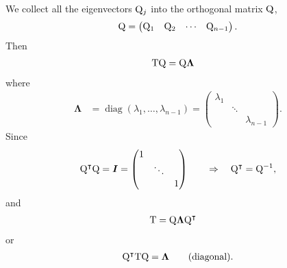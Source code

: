 We collect all the eigenvectors ${\mathrm Q}_j$ into the orthogonal matrix ${\mathrm Q}$,
\begin{equation*}
  {\mathrm Q} = \begin{pmatrix} {\mathrm Q}_1 & {\mathrm Q}_2 & \cdots & {\mathrm Q}_{n-1}\end{pmatrix}.
\end{equation*}
Then
\begin{align*}
  {\mathrm T} {\mathrm Q} &= {\mathrm Q} \boldsymbol \Lambda
\end{align*}
where
\begin{align*}
  \bm \Lambda &= \operatorname{diag}(\lambda_1, \ldots, \lambda_{n-1}) =
  \begin{pmatrix}
    \lambda_1 & & \\
     & \ddots & \\
    & & \lambda_{n-1}
  \end{pmatrix}.
\end{align*}
Since
\begin{align*}
  {\mathrm Q}^\intercal {\mathrm Q} = \boldsymbol I =
  \begin{pmatrix}
    1 & & \\
    & \ddots & \\
    & & 1
  \end{pmatrix} \qquad
  \Rightarrow \quad {\mathrm Q}^\intercal = {\mathrm Q}^{-1},
\end{align*}
and
\begin{align}
  {\mathrm T} &= {\mathrm Q} \boldsymbol \Lambda {\mathrm Q}^\intercal
  \label{eq:T_diag}
\end{align}
or
\begin{align*}
  {\mathrm Q}^\intercal {\mathrm T} {\mathrm Q} = \boldsymbol \Lambda \qquad \text{(diagonal)}.
\end{align*}

